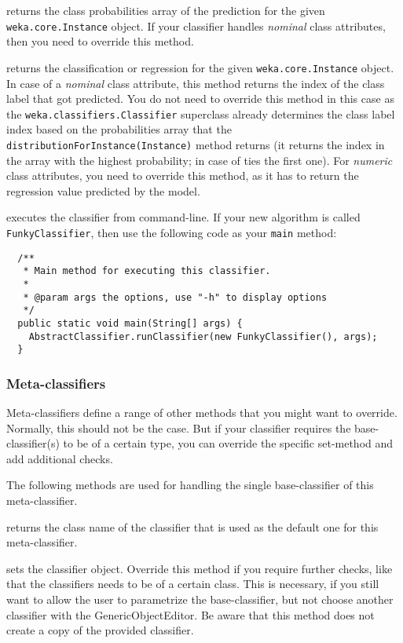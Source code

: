 returns the class probabilities array of the prediction for the given
\texttt{weka.core.Instance} object. If your classifier handles \textit{nominal}
class attributes, then you need to override this method.

returns the classification or regression for the given
\texttt{weka.core.Instance} object. In case of a \textit{nominal} class
attribute, this method returns the index of the class label that got predicted.
You do not need to override this method in this case as the
\texttt{weka.classifiers.Classifier} superclass already determines the class
label index based on the probabilities array that the
\texttt{distributionForInstance(Instance)} method returns (it returns the index
in the array with the highest probability; in case of ties the first one). For
\textit{numeric} class attributes, you need to override this method, as it has
to return the regression value predicted by the model.

executes the classifier from command-line. If your new algorithm is called
\texttt{FunkyClassifier}, then use the following code as your \texttt{main}
method:
\begin{verbatim}
  /**
   * Main method for executing this classifier.
   *
   * @param args the options, use "-h" to display options
   */
  public static void main(String[] args) {
    AbstractClassifier.runClassifier(new FunkyClassifier(), args);
  }
\end{verbatim}

\newpage
\subsubsection*{Meta-classifiers}
Meta-classifiers define a range of other methods that you might want to
override. Normally, this should not be the case. But if your classifier requires
the base-classifier(s) to be of a certain type, you can override the specific
set-method and add additional checks.

The following methods are used for handling the single base-classifier of this
meta-classifier.

returns the class name of the classifier that is used as the default one for
this meta-classifier.

sets the classifier object. Override this method if you require further checks,
like that the classifiers needs to be of a certain class. This is necessary, if
you still want to allow the user to parametrize the base-classifier, but not
choose another classifier with the GenericObjectEditor. Be aware that this
method does not create a copy of the provided classifier.

